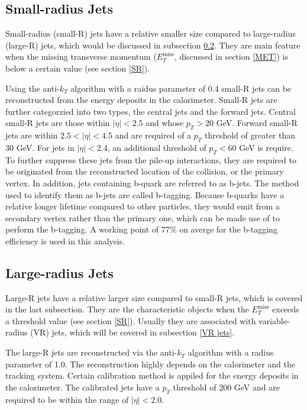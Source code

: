 \documentclass[class=NCU_thesis, crop=false]{standalone}
\begin{document}
	\subsection{Small-radius Jets}
		Small-radius (small-R) jets have a relative smaller size compared to large-radius (large-R) jets, which would be discussed in subsection \ref{large-R jets}. They are main feature when the missing transverse momentum ($E_T^{\mathrm{miss}}$, discussed in section \ref{MET}) is below a certain value (see section \ref{SR}).
	
		Using the anti-$k_T$ algorithm with a raidus parameter of 0.4 small-R jets can be reconstructed from the energy deposits in the calorimeter. Small-R jets are further categorzied into two types, the central jets and the forward jets. Central small-R jets are those within $\lvert \eta \rvert < 2.5$ and whose $p_T > 20$ GeV. Forward small-R jets are within $2.5 < \lvert \eta \rvert < 4.5$ and are required of a $p_T$ threshold of greater than 30 GeV. For jets in $\lvert \eta \rvert < 2.4$, an additional threshold of $p_T < 60$ GeV is require. To further suppress these jets from the pile-up interactions, they are required to be originated from the reconstructed location of the collision, or the primary vertex. In addition, jets containing b-quark are referred to as b-jets. The method used to identify them as b-jets are called b-tagging. Because b-quarks have a relative longer lifetime compared to other particles, they would emit from a secondary vertex rather than the primary one, which can be made use of to perform the b-tagging. A working point of 77\% on averge for the b-tagging efficiency is used in this analysis.
	
	\subsection{Large-radius Jets}\label{large-R jets}
		Large-R jets have a relative larger size compared to small-R jets, which is covered in the last subsection. They are the characteristic objects when the $E_T^{\mathrm{miss}}$ exceeds a threshold value (see section \ref{SR}). Usually they are associated with variable-radius (VR) jets, which will be covered in subsection \ref{VR jets}.
		
		The large-R jets are reconstructed via the anti-$k_T$ algorithm with a radius parameter of 1.0. The reconstruction highly depends on the calorimeter and the tracking system. Certain calibration method is appiled for the energy deposits in the calorimeter. The calibrated jets have a $p_T$ threshold of 200 GeV and are required to be within the range of $\lvert \eta \rvert < 2.0$.
	
\end{document}
